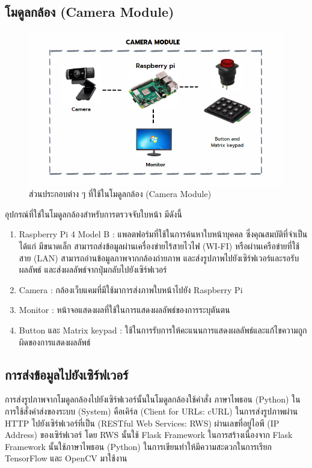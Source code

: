 \subsection{โมดูลกล้อง (Camera Module)}

\begin{figure}[h]
  \begin{center}
    \includegraphics[scale=.6]{pic/camera.png}
    \caption[Poem]{ส่วนประกอบต่าง ๆ ที่ใช้ในโมดูลกล้อง (Camera Module)}
    \label{fig:camera}
  \end{center}
\end{figure}
\newpage
อุปกรณ์ที่ใช่ในโมดูลกล้องสำหรับการตรวจจับใบหน้า มีดังนี้
\begin{enumerate}
  \item Raspberry Pi 4 Model B : แพลตฟอร์มที่ใช้ในการค้นหาใบหน้าบุคคล ซึ่งคุณสมบัติที่จำเป็นได้แก่ 
  มีขนาดเล็ก สามารถส่งข้อมูลผ่านเครื่องข่ายไร้สายไวไฟ (WI-FI) หรือผ่านเครือข่ายที่ใช้สาย (LAN) สามารถอ่านข้อมูลภาพจากกล้องถ่ายภาพ 
  และส่งรูปภาพไปยังเซิร์ฟเวอร์และรอรับผลลัพธ์ และส่งผลลัพธ์จากปุ่มกลับไปยังเซิร์ฟเวอร์
  \item Camera : กล้องเว็บแคมที่มีใช้มาการส่งภาพใบหน้าไปยัง Raspberry Pi
  \item Monitor : หน้าจอแสดงผลที่ใช้ในการแสดงผลลัพธ์ของการระบุตันตน
  \item Button และ Matrix keypad : ใช้ในการรับการให้คะแนนการแสดงผลลัพธ์และแก้ไขความถูกผิดของการแสดงผลลัพธ์
\end{enumerate}

\subsection{การส่งข้อมูลไปยังเซิร์ฟเวอร์}
การส่งรูปภาพจากโมดูลกล้องไปยังเซิร์ฟเวอร์นั้นในโมดูลกล้องใช้คำสั่ง ภาษาไพธอน (Python) ในการใช้สั่งคำส่งของระบบ (System)
คือเคิร์ล  (Client for URLs: cURL) ในการส่งรูปภาพผ่าน HTTP ไปยังเซิร์ฟเวอร์ที่เป็น (RESTful Web Services: RWS)
ผ่านเลขที่อยู่ไอพี (IP Address) ของเซิร์ฟเวอร์ โดย RWS นั้นใช้ Flask Framework 
ในการสร้างเนื่องจาก Flask Framework นั้นใช้ภาษาไพธอน (Python) ในการเขียนทำให้มีความสะดวกในการเรียก TensorFlow และ OpenCV มาใช้งาน

